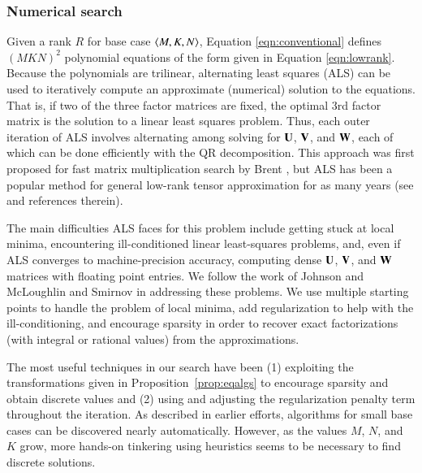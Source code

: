 \documentclass[preprint]{sigplanconf}
\newcommand{\M}[2][]{{\bm{#1\mathbf{\MakeUppercase{#2}}}}}
\begin{document}
\subsubsection{Numerical search}

Given a rank $R$ for base case $\left\langle M, K, N\right\rangle$, Equation \eqref{eqn:conventional} defines $(MKN)^2$ polynomial equations of the form given in Equation \eqref{eqn:lowrank}.
Because the polynomials are trilinear, alternating least squares (ALS) can be used to iteratively compute an approximate (numerical) solution to the equations.
That is, if two of the three factor matrices are fixed, the optimal 3rd factor matrix is the solution to a linear least squares problem.
Thus, each outer iteration of ALS involves alternating among solving for $\M{U}$, $\M{V}$, and $\M{W}$, each of which can be done efficiently with the QR decomposition.
This approach was first proposed for fast matrix multiplication search by Brent \cite{Brent70}, but ALS has been a popular method for general low-rank tensor approximation for as many years (see \cite{kolda2009tensor} and references therein).

The main difficulties ALS faces for this problem include getting stuck at local minima, encountering ill-conditioned linear least-squares problems, and, even if ALS converges to machine-precision accuracy, computing dense $\M{U}$, $\M{V}$, and $\M{W}$ matrices with floating point entries.
We follow the work of Johnson and McLoughlin \cite{JM86} and Smirnov \cite{smirnov2013bilinear} in addressing these problems.
We use multiple starting points to handle the problem of local minima, add regularization to help with the ill-conditioning, and encourage sparsity in order to recover exact factorizations (with integral or rational values) from the approximations.

The most useful techniques in our search have been (1) exploiting the transformations given in Proposition~\ref{prop:eqalgs} to encourage sparsity and obtain discrete values and (2) using and adjusting the regularization penalty term \cite[Equations (4-5)]{smirnov2013bilinear} throughout the iteration. 
As described in earlier efforts, algorithms for small base cases can be discovered nearly automatically.
However, as the values $M$, $N$, and $K$ grow, more hands-on tinkering using heuristics seems to be necessary to find discrete solutions.
\end{document}
